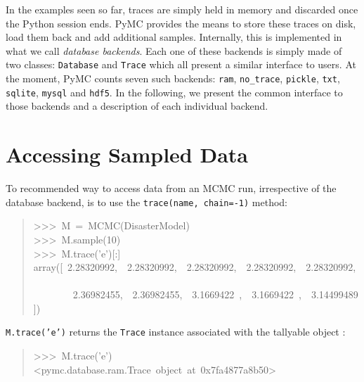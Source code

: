 

In the examples seen so far, traces are simply held in memory and discarded once
the Python session ends. PyMC provides the means to store these traces on disk,
load them back and add additional samples. Internally, this is implemented in
what we call \emph{database backends}. Each one of these backends is simply made
of two classes: \texttt{Database} and \texttt{Trace} which all present a similar
interface to users.
At the moment, PyMC counts seven such backends: \texttt{ram}, \texttt{no{\_}trace},
\texttt{pickle}, \texttt{txt}, \texttt{sqlite}, \texttt{mysql} and \texttt{hdf5}.
In the following, we present the common interface to those backends and a
description of each individual backend.



\hypertarget{accessing-sampled-data}{}
\section*{Accessing Sampled Data}
\label{accessing-sampled-data}

To recommended way to access data from an MCMC run, irrespective of the
database backend, is to use the \texttt{trace(name, chain=-1)} method:
\begin{quote}{\ttfamily \raggedright \noindent
>{}>{}>~M~=~MCMC(DisasterModel)~\\
>{}>{}>~M.sample(10)~\\
>{}>{}>~M.trace('e'){[}:{]}~\\
array({[}~2.28320992,~~2.28320992,~~2.28320992,~~2.28320992,~~2.28320992,~\\
~~~~~~~~2.36982455,~~2.36982455,~~3.1669422~,~~3.1669422~,~~3.14499489{]})
}\end{quote}

\texttt{M.trace('e')} returns the \texttt{Trace} instance associated with the tallyable
object :
\begin{quote}{\ttfamily \raggedright \noindent
>{}>{}>~M.trace('e')~\\
<pymc.database.ram.Trace~object~at~0x7fa4877a8b50>
}\end{quote}

